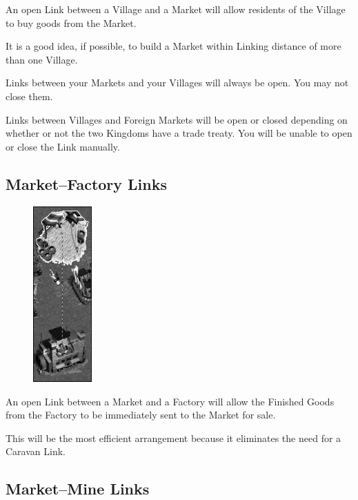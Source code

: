 An open Link between a Village and a Market will allow residents of the Village to buy goods from the Market.

It is a good idea, if possible, to build a Market within Linking distance of more than one Village.

Links between your Markets and your Villages will always be open. You may not close them.

Links between Villages and Foreign Markets will be open or closed depending on whether or not the two Kingdoms have a trade treaty. You will be unable to open or close the Link manually.

\subsection{Market–Factory Links}

\begin{figure}
	\vspace{-20pt}
	\begin{center}
		\includegraphics[width=0.2\textwidth]{Ilink_factorymarket}
	\end{center}
	\vspace{-20pt}
\end{figure}

An open Link between a Market and a Factory will allow the Finished Goods from the Factory to be immediately sent to the Market for sale.

This will be the most efficient arrangement because it eliminates the need for a Caravan Link.

\clearpage

\subsection{Market–Mine Links}

